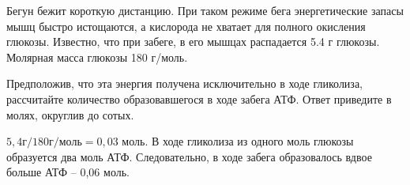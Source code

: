 
Бегун бежит короткую
дистанцию. При таком режиме бега энергетические запасы мышц быстро истощаются,
а кислорода не хватает для полного окисления глюкозы. Известно, что при забеге,
в его мышцах распадается 5.4 г глюкозы. Молярная масса глюкозы 180 г/моль.

Предположив, что эта энергия получена исключительно в ходе гликолиза, рассчитайте количество образовавшегося в ходе забега АТФ. Ответ приведите в
молях, округлив до сотых.

\solutionSection

$5,4 \text{г} / 180 \text{г} / \text{моль} = 0,03$ моль. В ходе гликолиза из одного моль глюкозы 
образуется два моль АТФ. Следовательно, в ходе забега образовалось вдвое больше АТФ – 0,06 моль.

